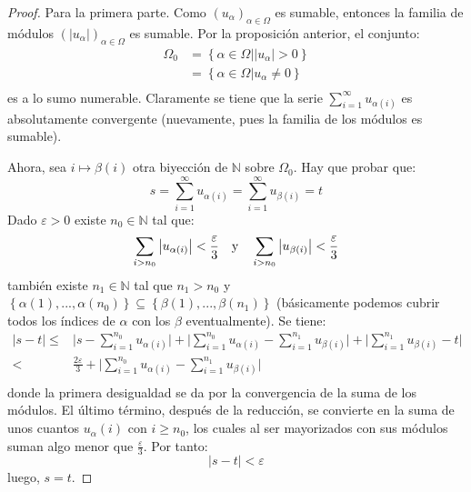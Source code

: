 \documentclass[12pt]{report}
\theoremstyle{largebreak}
\newcommand\abs[1]{\ensuremath{\big|#1\big|}}
\begin{document}
    \begin{proof}
        Para la primera parte. Como $\left(u_\alpha \right)_{\alpha\in\Omega}$ es sumable, entonces la familia de módulos $\left(\abs{u_\alpha} \right)_{\alpha\in\Omega}$ es sumable. Por la proposición anterior, el conjunto:
        \begin{equation*}
            \begin{split}
                \Omega_0&=\left\{\alpha\in\Omega\Big|\abs{u_\alpha}>0 \right\}\\
                &=\left\{\alpha\in\Omega\Big|u_\alpha\neq0 \right\}\\
            \end{split}
        \end{equation*}
        es a lo sumo numerable. Claramente se tiene que la serie $\sum_{i=1 }^{\infty}u_{\alpha(i)}$ es absolutamente convergente (nuevamente, pues la familia de los módulos es sumable).

        Ahora, sea $i\mapsto\beta(i)$ otra biyección de $\mathbb{N}$ sobre $\Omega_0$. Hay que probar que:
        \begin{equation*}
            s=\sum_{i=1 }^{\infty}u_{\alpha(i)}=\sum_{i=1 }^{\infty}u_{\beta(i)}=t
        \end{equation*}
        Dado $\varepsilon>0$ existe $n_0\in\mathbb{N}$ tal que:
        \begin{equation*}
            \sum_{i>n_0 }\abs{u_{\alpha(i)} }<\frac{\varepsilon}{3}\quad\textup{y}\quad \sum_{i>n_0 }\abs{u_{\beta(i)} }<\frac{\varepsilon}{3}
        \end{equation*}
        también existe $n_1\in\mathbb{N}$ tal que $n_1>n_0$ y $\left\{\alpha(1),...,\alpha(n_0)\right\}\subseteq\left\{\beta(1),...,\beta(n_1) \right\}$ (básicamente podemos cubrir todos los índices de $\alpha$ con los $\beta$ eventualmente). Se tiene:
        \begin{equation*}
            \begin{split}
                \abs{s-t}\leq&\abs{s-\sum_{i=1 }^{n_0}u_{\alpha(i)}}+\abs{\sum_{i=1 }^{n_0 }u_{\alpha(i)}-\sum_{i=1 }^{n_1 }u_{\beta(i)}}+\abs{\sum_{i=1 }^{n_1}u_{\beta(i)}-t} \\
                < &\frac{2\varepsilon}{3}+\abs{\sum_{i=1 }^{n_0 }u_{\alpha(i)}-\sum_{i=1 }^{n_1 }u_{\beta(i)}}\\
            \end{split}
        \end{equation*}
        donde la primera desigualdad se da por la convergencia de la suma de los módulos. El último término, después de la reducción, se convierte en la suma de unos cuantos $u_\alpha(i)$ con $i\geq n_0$, los cuales al ser mayorizados con sus módulos suman algo menor que $\frac{\varepsilon}{3}$. Por tanto:
        \begin{equation*}
            \abs{s-t}<\varepsilon
        \end{equation*}
        luego, $s=t$.
    \end{proof}
\end{document}
